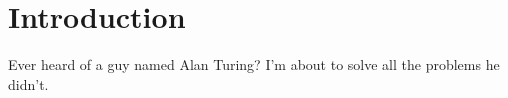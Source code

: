 \chapter{Introduction} \label{sec:intro}

Ever heard of a guy named Alan Turing? I'm about to solve all the problems he didn't.
